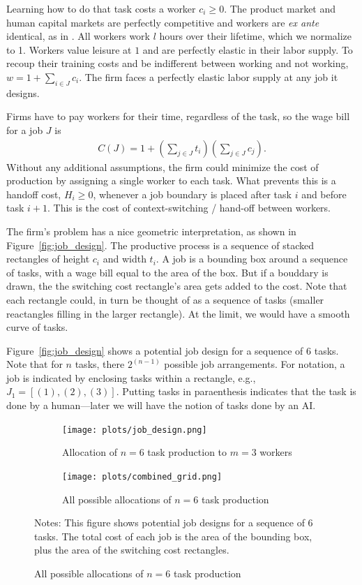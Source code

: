 \documentclass{article}
\begin{document}
Learning how to do that task costs a worker $c_i \ge 0$.
The product market and human capital markets are perfectly competitive and workers are \emph{ex ante} identical, as in \cite{becker1992division}.
All workers work $l$ hours over their lifetime, which we normalize to 1.
Workers value leisure at $1$ and are perfectly elastic in their labor supply.
To recoup their training costs and be indifferent between working and not working, $w = 1 + \sum_{i \in J} c_i$.
The firm faces a perfectly elastic labor supply at any job it designs.

Firms have to pay workers for their time, regardless of the task, so the wage bill for a job $J$ is 
\begin{align*}
   C(J) = 1 + \left(\sum_{j \in J} t_i\right)\left(\sum_{j \in J} c_j\right).
\end{align*}
Without any additional assumptions, the firm could minimize the cost of production by assigning a single worker to each task.
What prevents this is a handoff cost, $H_i \geq 0$, whenever a job boundary is placed after task $i$ and before task $i+1$. 
This is the cost of context-switching / hand-off between workers. 

The firm's problem has a nice geometric interpretation, as shown in Figure~\ref{fig:job_design}.
The productive process is a sequence of stacked rectangles of height $c_i$ and width $t_i$.
A job is a bounding box around a sequence of tasks, with a wage bill equal to the area of the box. 
But if a bouddary is drawn, the the switching cost rectangle's area gets added to the cost. 
Note that each rectangle could, in turn be thought of as a sequence of tasks (smaller reactangles filling in the larger rectangle).
At the limit, we would have a smooth curve of tasks. 

Figure~\ref{fig:job_design} shows a potential job design for a sequence of 6 tasks. 
Note that for $n$ tasks, there $2^(n-1)$ possible job arrangements. 
For notation, a job is indicated by enclosing tasks within a rectangle, e.g., $J_1 = [(1),(2), (3)]$.
Putting tasks in paraenthesis indicates that the task is done by a human---later we will have the notion of tasks done by an AI.

\begin{figure}[htbp]
  \begin{center}
  \caption{Example allocations of workers to tasks when $n = 6$} \label{fig:job_design}
  \begin{subfigure}[b]{0.48\textwidth}
    \texttt{[image: plots/job\_design.png]}
    \caption{Allocation of $n=6$ task production to $m = 3$ workers}
  \end{subfigure}
  \hfill
  \begin{subfigure}[b]{0.48\textwidth}
    \texttt{[image: plots/combined\_grid.png]}
    \caption{All possible allocations of $n=6$ task production}
  \end{subfigure}
  \end{center}
  \footnotesize{Notes: This figure shows potential job designs for a sequence of 6 tasks.
  The total cost of each job is the area of the bounding box, plus the area of the switching cost rectangles.
  }
\end{figure}
\end{document}

